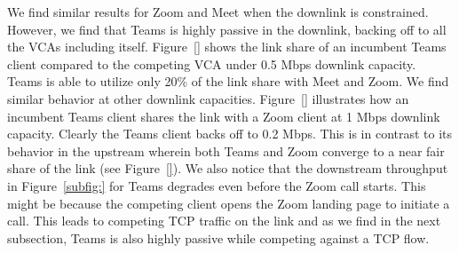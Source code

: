 We find similar results for Zoom and Meet when the downlink is constrained. However, we find that Teams is highly passive in the downlink, backing off to all the VCAs including itself. Figure~\ref{} shows the link share of an incumbent Teams client compared to the competing VCA under 0.5 Mbps downlink capacity. Teams is able to utilize only 20\% of the link share with Meet and Zoom. We find similar behavior at other downlink capacities. Figure~\ref{} illustrates how an incumbent Teams client shares the link with a Zoom client at 1 Mbps downlink capacity. Clearly the Teams client backs off to 0.2 Mbps. This is in contrast to its behavior in the upstream wherein both Teams and Zoom converge to a near fair share of the link (see Figure~\ref{}). We also notice that the downstream throughput in Figure~\ref{subfig:} for Teams degrades even before the Zoom call starts. This might be because the competing client opens the Zoom landing page to initiate a call. This leads to competing TCP traffic on the link and as we find in the next subsection, Teams is also highly passive while competing against a TCP flow. %




